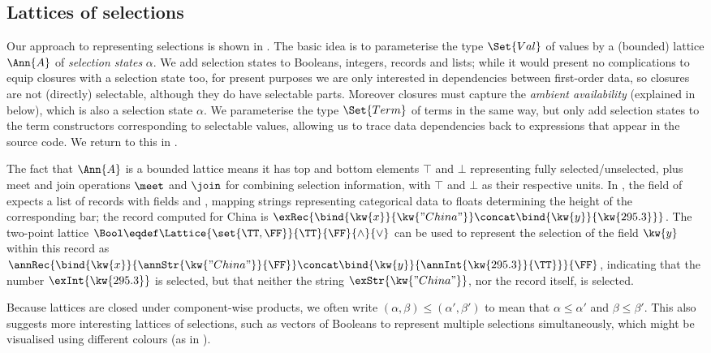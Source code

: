 \subsection{Lattices of selections}
\label{sec:data-dependencies:lattices-of-selections}

Our approach to representing selections is shown in . The basic idea is to parameterise the type $\Set{Val}$ of values by a (bounded) lattice $\Ann{A}$ of \emph{selection states} $\alpha$. We add selection states to Booleans, integers, records and lists; while it would present no complications to equip closures with a selection state too, for present purposes we are only interested in dependencies between first-order data, so closures are not (directly) selectable, although they do have selectable parts. Moreover closures must capture the \emph{ambient availability} (explained in  below), which is also a selection state $\alpha$. We parameterise the type $\Set{Term}$ of terms in the same way, but only add selection states to the term constructors corresponding to selectable values, allowing us to trace data dependencies back to expressions that appear in the source code. We return to this in .



The fact that $\Ann{A}$ is a bounded lattice means it has top and bottom elements $\top$ and $\bot$ representing fully selected/unselected, plus meet and join operations $\meet$ and $\join$ for combining selection information, with $\top$ and $\bot$ as their respective units. In , the  field of  expects a list of records with fields  and , mapping strings representing categorical data to floats determining the height of the corresponding bar; the record computed for China is $\exRec{\bind{\kw{x}}{\kw{"China"}} \concat \bind{\kw{y}}{\kw{295.3}}}$. The two-point lattice $\Bool \eqdef \Lattice{\set{\TT,\FF}}{\TT}{\FF}{\wedge}{\vee}$ can be used to represent the selection of the field $\kw{y}$ within this record as $\annRec{\bind{\kw{x}}{\annStr{\kw{"China"}}{\FF}} \concat \bind{\kw{y}}{\annInt{\kw{295.3}}{\TT}}}{\FF}$, indicating that the number $\exInt{\kw{295.3}}$ is selected, but that neither the string $\exStr{\kw{"China"}}$, nor the record itself, is selected.

Because lattices are closed under component-wise products, we often write $(\alpha, \beta) \leq (\alpha', \beta')$ to mean that $\alpha \leq \alpha'$ and $\beta \leq \beta'$. This also suggests more interesting lattices of selections, such as vectors of Booleans to represent multiple selections simultaneously, which might be visualised using different colours (as in ).

